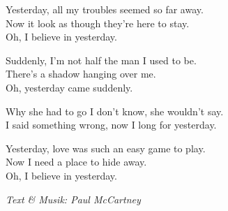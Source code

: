 \vspace{10pt}
Yesterday, all my troubles seemed so far away.\\
Now it look as though they're here to stay.\\
Oh, I believe in yesterday.\par
\vspace{10pt}
Suddenly, I'm not half the man I used to be.\\
There's a shadow hanging over me.\\
Oh, yesterday came suddenly.\par
\vspace{10pt}
Why she had to go I don't know, she wouldn't say.\\
I said something wrong, now I long for yesterday.\par
\vspace{10pt}
Yesterday, love was such an easy game to play.\\
Now I need a place to hide away.\\
Oh, I believe in yesterday.\par
\vspace{10pt}
{\footnotesize\textit{Text \& Musik: Paul McCartney}}
